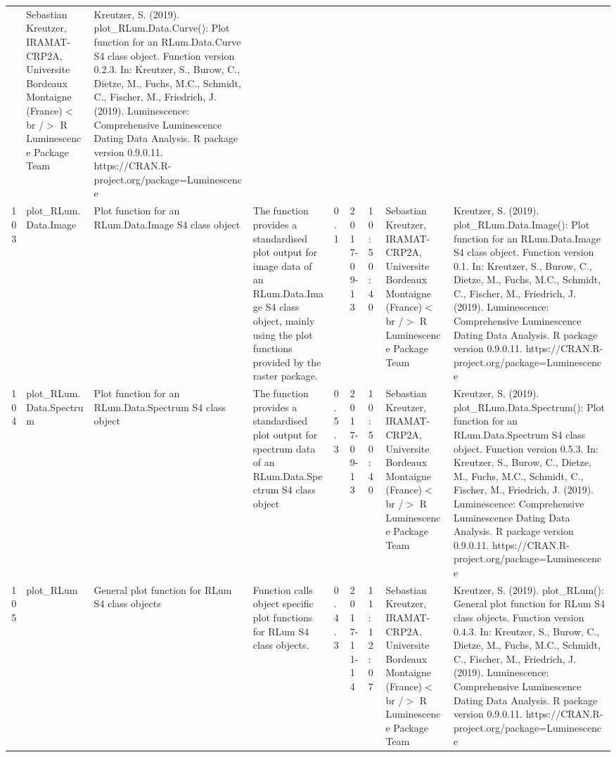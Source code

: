 \begin{table}[ht]
\begin{tabular}{rllllllll}
 & Sebastian Kreutzer, IRAMAT-CRP2A, Universite Bordeaux Montaigne (France)$<$br /$>$  R Luminescence Package Team & Kreutzer, S. (2019). plot\_RLum.Data.Curve(): Plot function for an RLum.Data.Curve S4 class object. Function version 0.2.3. In: Kreutzer, S., Burow, C., Dietze, M., Fuchs, M.C., Schmidt, C., Fischer, M., Friedrich, J. (2019). Luminescence: Comprehensive Luminescence Dating Data Analysis. R package version 0.9.0.11. https://CRAN.R-project.org/package=Luminescence
 \\ 
  103 & plot\_RLum.Data.Image & Plot function for an  RLum.Data.Image  S4 class object & The function provides a standardised plot output for image data of an RLum.Data.Image S4 class object, mainly using the plot functions provided by the  raster  package. & 0.1 & 2017-09-13 & 10:50:40
 & Sebastian Kreutzer, IRAMAT-CRP2A, Universite Bordeaux Montaigne (France)$<$br /$>$  R Luminescence Package Team & Kreutzer, S. (2019). plot\_RLum.Data.Image(): Plot function for an RLum.Data.Image S4 class object. Function version 0.1. In: Kreutzer, S., Burow, C., Dietze, M., Fuchs, M.C., Schmidt, C., Fischer, M., Friedrich, J. (2019). Luminescence: Comprehensive Luminescence Dating Data Analysis. R package version 0.9.0.11. https://CRAN.R-project.org/package=Luminescence
 \\ 
  104 & plot\_RLum.Data.Spectrum & Plot function for an RLum.Data.Spectrum S4 class object & The function provides a standardised plot output for spectrum data of an RLum.Data.Spectrum S4 class object & 0.5.3 & 2017-09-13 & 10:50:40
 & Sebastian Kreutzer, IRAMAT-CRP2A, Universite Bordeaux Montaigne (France)$<$br /$>$  R Luminescence Package Team & Kreutzer, S. (2019). plot\_RLum.Data.Spectrum(): Plot function for an RLum.Data.Spectrum S4 class object. Function version 0.5.3. In: Kreutzer, S., Burow, C., Dietze, M., Fuchs, M.C., Schmidt, C., Fischer, M., Friedrich, J. (2019). Luminescence: Comprehensive Luminescence Dating Data Analysis. R package version 0.9.0.11. https://CRAN.R-project.org/package=Luminescence
 \\ 
  105 & plot\_RLum & General plot function for RLum S4 class objects & Function calls object specific plot functions for RLum S4 class objects. & 0.4.3 & 2017-11-14 & 11:12:07
 & Sebastian Kreutzer, IRAMAT-CRP2A, Universite Bordeaux Montaigne (France)$<$br /$>$  R Luminescence Package Team & Kreutzer, S. (2019). plot\_RLum(): General plot function for RLum S4 class objects. Function version 0.4.3. In: Kreutzer, S., Burow, C., Dietze, M., Fuchs, M.C., Schmidt, C., Fischer, M., Friedrich, J. (2019). Luminescence: Comprehensive Luminescence Dating Data Analysis. R package version 0.9.0.11. https://CRAN.R-project.org/package=Luminescence

\end{tabular}
\end{table}
